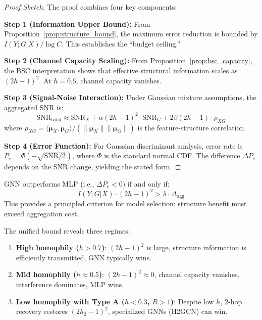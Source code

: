 \begin{proof}[Proof Sketch]
The proof combines four key components:

\textbf{Step 1 (Information Upper Bound):} From Proposition~\ref{prop:structure_bound}, the maximum error reduction is bounded by $I(Y; G | X) / \log C$. This establishes the ``budget ceiling.''

\textbf{Step 2 (Channel Capacity Scaling):} From Proposition~\ref{prop:bsc_capacity}, the BSC interpretation shows that effective structural information scales as $(2h-1)^2$. At $h = 0.5$, channel capacity vanishes.

\textbf{Step 3 (Signal-Noise Interaction):} Under Gaussian mixture assumptions, the aggregated SNR is:
\begin{equation}
    \text{SNR}_{\text{total}} \approx \text{SNR}_X + \alpha (2h-1)^2 \cdot \text{SNR}_G + 2\beta (2h-1) \cdot \rho_{XG}
\end{equation}
where $\rho_{XG} = \langle \boldsymbol{\mu}_X, \boldsymbol{\mu}_G \rangle / (\|\boldsymbol{\mu}_X\| \|\boldsymbol{\mu}_G\|)$ is the feature-structure correlation.

\textbf{Step 4 (Error Function):} For Gaussian discriminant analysis, error rate is $P_e = \Phi(-\sqrt{\text{SNR}/2})$, where $\Phi$ is the standard normal CDF. The difference $\Delta P_e$ depends on the SNR change, yielding the stated form.
\end{proof}

\begin{corollary}
\label{cor:gnn_benefit_condition}
GNN outperforms MLP (i.e., $\Delta P_e < 0$) if and only if:
\begin{equation}
    I(Y; G | X) \cdot (2h-1)^2 > \lambda \cdot \Delta_{\text{agg}}
\end{equation}
This provides a principled criterion for model selection: structure benefit must exceed aggregation cost.
\end{corollary}

\begin{remark}
The unified bound reveals three regimes:
\begin{enumerate}
    \item \textbf{High homophily ($h > 0.7$)}: $(2h-1)^2$ is large, structure information is efficiently transmitted, GNN typically wins.
    \item \textbf{Mid homophily ($h \approx 0.5$)}: $(2h-1)^2 \approx 0$, channel capacity vanishes, interference dominates, MLP wins.
    \item \textbf{Low homophily with Type A ($h < 0.3$, $R > 1$)}: Despite low $h$, 2-hop recovery restores $(2h_2-1)^2$, specialized GNNs (H2GCN) can win.
\end{enumerate}
\end{remark}


